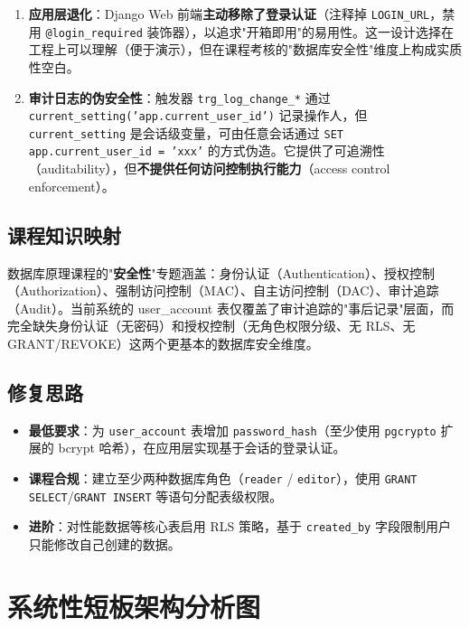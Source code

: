 \documentclass[UTF8,a4paper,11pt]{ctexart}
\begin{document}
\begin{enumerate}
    \item \textbf{应用层退化}：Django Web 前端\textbf{主动移除了登录认证}（注释掉 \texttt{LOGIN\_URL}，禁用 \texttt{@login\_required} 装饰器），以追求"开箱即用"的易用性。这一设计选择在工程上可以理解（便于演示），但在课程考核的"数据库安全性"维度上构成实质性空白。
    
    \item \textbf{审计日志的伪安全性}：触发器 \texttt{trg\_log\_change\_*} 通过 \texttt{current\_setting('app.current\_user\_id')} 记录操作人，但\texttt{current\_setting} 是会话级变量，可由任意会话通过 \texttt{SET app.current\_user\_id = 'xxx'} 的方式伪造。它提供了可追溯性（auditability），但\textbf{不提供任何访问控制执行能力}（access control enforcement）。
\end{enumerate}

\subsection{课程知识映射}

数据库原理课程的"\textbf{安全性}"专题涵盖：身份认证（Authentication）、授权控制（Authorization）、强制访问控制（MAC）、自主访问控制（DAC）、审计追踪（Audit）。当前系统的 user\_account 表仅覆盖了审计追踪的"事后记录"层面，而完全缺失身份认证（无密码）和授权控制（无角色权限分级、无 RLS、无 GRANT/REVOKE）这两个更基本的数据库安全维度。

\subsection{修复思路}

\begin{itemize}
    \item \textbf{最低要求}：为 \texttt{user\_account} 表增加 \texttt{password\_hash}（至少使用 \texttt{pgcrypto} 扩展的 bcrypt 哈希），在应用层实现基于会话的登录认证。
    \item \textbf{课程合规}：建立至少两种数据库角色（\texttt{reader} / \texttt{editor}），使用 \texttt{GRANT SELECT}/\texttt{GRANT INSERT} 等语句分配表级权限。
    \item \textbf{进阶}：对性能数据等核心表启用 RLS 策略，基于 \texttt{created\_by} 字段限制用户只能修改自己创建的数据。
\end{itemize}

\section{系统性短板架构分析图}
\end{document}
